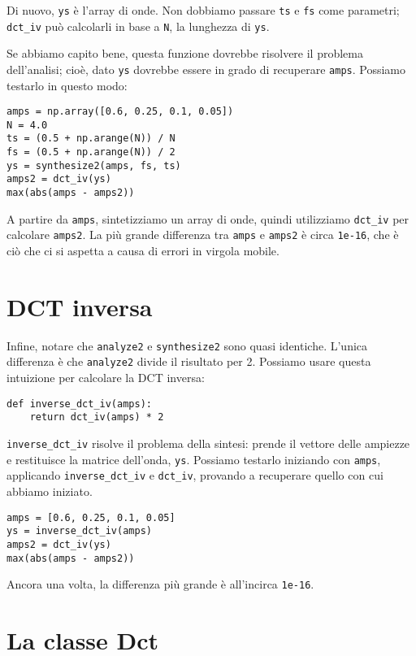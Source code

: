 \documentclass[12pt,a4paper]{book}
\begin{document}
Di nuovo, {\tt ys} è l'array di onde. Non dobbiamo passare {\tt ts} e {\tt fs} come parametri; \verb"dct_iv" può calcolarli in base a {\tt N}, la lunghezza di {\tt ys}.

Se abbiamo capito bene, questa funzione dovrebbe risolvere il problema dell'analisi; cioè, dato {\tt ys} dovrebbe essere in grado di recuperare {\tt amps}. Possiamo testarlo in questo modo:

\begin{verbatim} 
amps = np.array([0.6, 0.25, 0.1, 0.05])
N = 4.0
ts = (0.5 + np.arange(N)) / N
fs = (0.5 + np.arange(N)) / 2
ys = synthesize2(amps, fs, ts)
amps2 = dct_iv(ys)
max(abs(amps - amps2))
 \end{verbatim} 

A partire da {\tt amps}, sintetizziamo un array di onde, quindi utilizziamo \verb"dct_iv" per calcolare {\tt amps2}. La più grande differenza tra {\tt amps} e {\tt amps2} è circa {\tt 1e-16}, che è ciò che ci si aspetta a causa di errori in virgola mobile.

\section{DCT inversa} 

Infine, notare che {\tt analyze2} e {\tt synthesize2} sono quasi identiche. L'unica differenza è che {\tt analyze2} divide il risultato per 2. Possiamo usare questa intuizione per calcolare la DCT inversa:

\begin{verbatim} 
def inverse_dct_iv(amps):
    return dct_iv(amps) * 2
 \end{verbatim} 

\verb"inverse_dct_iv" risolve il problema della sintesi: prende il vettore delle ampiezze e restituisce la matrice dell'onda, {\tt ys}. Possiamo testarlo iniziando con {\tt amps}, applicando \verb"inverse_dct_iv" e \verb"dct_iv", provando a recuperare quello con cui abbiamo iniziato.

\begin{verbatim} 
amps = [0.6, 0.25, 0.1, 0.05]
ys = inverse_dct_iv(amps)
amps2 = dct_iv(ys)
max(abs(amps - amps2))
 \end{verbatim} 

Ancora una volta, la differenza più grande è all'incirca {\tt 1e-16}.

\section{La classe Dct} 
\end{document}
